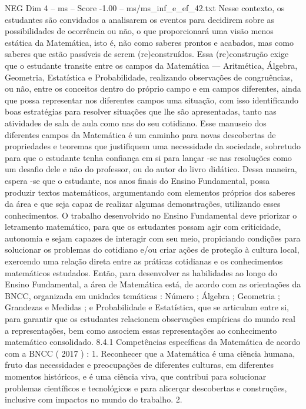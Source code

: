 \begin{textsample}{NEG Dim 4 – ms – Score -1.00 – ms/ms\_inf\_e\_ef\_42.txt}
Nesse contexto, os estudantes são convidados a analisarem os eventos para decidirem sobre as possibilidades de ocorrência ou não, o que proporcionará uma visão menos estática da Matemática, isto é, não como saberes prontos e acabados, mas como saberes que estão passíveis de serem (re)construídos.
Essa (re)construção exige que o estudante transite entre os campos da Matemática — Aritmética, Álgebra, Geometria, Estatística e Probabilidade, realizando observações de congruências, ou não, entre os conceitos dentro do próprio campo e em campos diferentes, ainda que possa representar nos diferentes campos uma situação, com isso identificando boas estratégias para resolver situações que lhe são apresentadas, tanto nas atividades de sala de aula como nas do seu cotidiano.
Esse manuseio dos diferentes campos da Matemática é um caminho para novas descobertas de propriedades e teoremas que justifiquem uma necessidade da sociedade, sobretudo para que o estudante tenha confiança em si para lançar -se nas resoluções como um desafio dele e não do professor, ou do autor do livro didático.
Dessa maneira, espera -se que o estudante, nos anos finais do Ensino Fundamental, possa produzir textos matemáticos, argumentando com elementos próprios dos saberes da área e que seja capaz de realizar algumas demonstrações, utilizando esses conhecimentos.
O trabalho desenvolvido no Ensino Fundamental deve priorizar o letramento matemático, para que os estudantes possam agir com criticidade, autonomia e sejam capazes de interagir com seu meio, propiciando condições para solucionar os problemas do cotidiano e/ou criar ações de proteção à cultura local, exercendo uma relação direta entre as práticas cotidianas e os conhecimentos matemáticos estudados.
Então, para desenvolver as habilidades ao longo do Ensino Fundamental, a área de Matemática está, de acordo com as orientações da BNCC, organizada em unidades temáticas : Número ; Álgebra ; Geometria ; Grandezas e Medidas ; e Probabilidade e Estatística, que se articulam entre si, para garantir que os estudantes relacionem observações empíricas do mundo real a representações, bem como associem essas representações ao conhecimento matemático consolidado. 8.4.1 Competências específicas da Matemática de acordo com a BNCC ( 2017 ) : 1.
Reconhecer que a Matemática é uma ciência humana, fruto das necessidades e preocupações de diferentes culturas, em diferentes momentos históricos, e é uma ciência viva, que contribui para solucionar problemas científicos e tecnológicos e para alicerçar descobertas e construções, inclusive com impactos no mundo do trabalho. 2.

\end{textsample}
